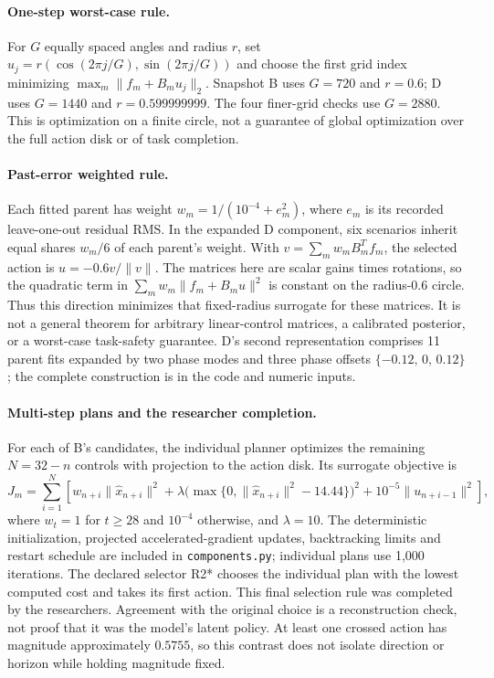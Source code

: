 \paragraph{One-step worst-case rule.}
For $G$ equally spaced angles and radius $r$, set $u_j=r(\cos(2\pi j/G),\sin(2\pi j/G))$ and choose the first grid index minimizing $\max_m\|f_m+B_m u_j\|_2$. Snapshot B uses $G = 720$ and $r = 0.6$; D uses $G = 1440$ and $r = 0.599999999$. The four finer-grid checks use $G=2880$. This is optimization on a finite circle, not a guarantee of global optimization over the full action disk or of task completion.

\paragraph{Past-error weighted rule.}
Each fitted parent has weight $w_m=1/(10^{-4}+e_m^2)$, where $e_m$ is its recorded leave-one-out residual RMS. In the expanded D component, six scenarios inherit equal shares $w_m/6$ of each parent's weight. With $v=\sum_m w_m B_m^Tf_m$, the selected action is $u=-0.6v/\|v\|$. The matrices here are scalar gains times rotations, so the quadratic term in $\sum_mw_m\|f_m+B_mu\|^2$ is constant on the radius-$0.6$ circle. Thus this direction minimizes that fixed-radius surrogate for these matrices. It is not a general theorem for arbitrary linear-control matrices, a calibrated posterior, or a worst-case task-safety guarantee. D's second representation comprises 11 parent fits expanded by two phase modes and three phase offsets $\{-0.12,\,0,\,0.12\}$; the complete construction is in the code and numeric inputs.

\paragraph{Multi-step plans and the researcher completion.}
For each of B's candidates, the individual planner optimizes the remaining $N=32-n$ controls with projection to the action disk. Its surrogate objective is
\begin{equation}
 J_m=\sum_{i=1}^{N}\left[w_{n+i}\|\hat x_{n+i}\|^2+\lambda\big(\max\{0,\|\hat x_{n+i}\|^2-14.44\}\big)^2+10^{-5}\|u_{n+i-1}\|^2\right],
\end{equation}
where $w_t=1$ for $t\geq28$ and $10^{-4}$ otherwise, and $\lambda=10$. The deterministic initialization, projected accelerated-gradient updates, backtracking limits and restart schedule are included in \texttt{components.py}; individual plans use 1,000 iterations. The declared selector R2* chooses the individual plan with the lowest computed cost and takes its first action. This final selection rule was completed by the researchers. Agreement with the original choice is a reconstruction check, not proof that it was the model's latent policy. At least one crossed action has magnitude approximately $0.5755$, so this contrast does not isolate direction or horizon while holding magnitude fixed.

